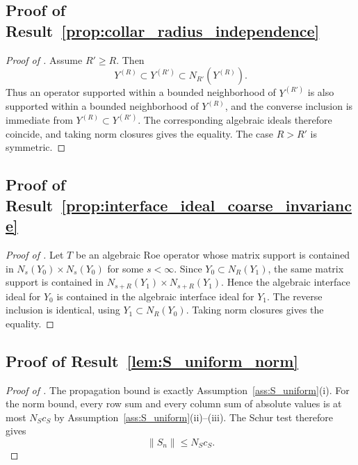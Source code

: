 \documentclass[11pt]{article}
\numberwithin{equation}{section}
\theoremstyle{definition}
\theoremstyle{remark}
\newcommand{\opnorm}[1]{\left\lVert#1\right\rVert}
\begin{document}
\subsection{Proof of Result~\ref{prop:collar_radius_independence}}\label{app:proof:prop:collar_radius_independence}
\begin{proof}[Proof of ]
Assume $R'\ge R$. Then
\[
Y^{(R)}\subset Y^{(R')}\subset N_{R'}(Y^{(R)}).
\]
Thus an operator supported within a bounded neighborhood of $Y^{(R')}$ is also supported within a
bounded neighborhood of $Y^{(R)}$, and the converse inclusion is immediate from
$Y^{(R)}\subset Y^{(R')}$. The corresponding algebraic ideals therefore coincide, and taking norm
closures gives the equality. The case $R>R'$ is symmetric.
\end{proof}

\subsection{Proof of Result~\ref{prop:interface_ideal_coarse_invariance}}\label{app:proof:prop:interface_ideal_coarse_invariance}
\begin{proof}[Proof of ]
Let \(T\) be an algebraic Roe operator whose matrix support is contained in
\(N_s(Y_0)\times N_s(Y_0)\) for some \(s<\infty\). Since \(Y_0\subset N_R(Y_1)\), the same matrix
support is contained in \(N_{s+R}(Y_1)\times N_{s+R}(Y_1)\). Hence the algebraic interface ideal
for \(Y_0\) is contained in the algebraic interface ideal for \(Y_1\). The reverse inclusion is
identical, using \(Y_1\subset N_R(Y_0)\). Taking norm closures gives the equality.
\end{proof}

\subsection{Proof of Result~\ref{lem:S_uniform_norm}}\label{app:proof:lem:S_uniform_norm}
\begin{proof}[Proof of ]
The propagation bound is exactly Assumption~\ref{ass:S_uniform}(i). For the norm bound, every row
sum and every column sum of absolute values is at most $N_Sc_S$ by
Assumption~\ref{ass:S_uniform}(ii)--(iii). The Schur test therefore gives
\[
\opnorm{S_n}\le N_Sc_S.
\]
\end{proof}
\end{document}
